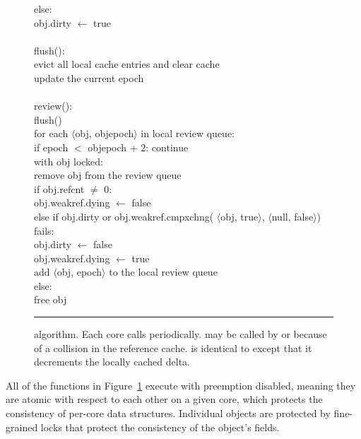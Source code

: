 \begin{figure}
\begin{tabbing}
          else: \+\\
            obj.dirty $\gets$ true \\
    \-\-\-\-\\[\fgap]
    flush(): \+\\
      evict all local cache entries and clear cache \\
      update the current epoch \\
    \-\\[\fgap]
    review(): \+\\
      flush() \\
      for each $\langle$obj, objepoch$\rangle$ in local review queue: \+\\
        if epoch $<$ objepoch + 2: continue \\
        with obj locked: \+\\
          remove obj from the review queue \\
          if obj.refcnt $\ne$ 0: \+\\
            obj.weakref.dying $\gets$ false \-\\
          else if obj.dirty or obj.weakref.cmpxchng(%
                $\langle$obj, true$\rangle$,
                $\langle$null, false$\rangle$) fails: \+\\
            obj.dirty $\gets$ false \\
            obj.weakref.dying $\gets$ true \\
            add $\langle$obj, epoch$\rangle$ to the local review queue \-\\
          else: \+\\
            free obj
  \end{tabbing}
  \vspace{-1em}                 %
  \rule{\columnwidth}{0.5pt}
  \vspace{-\baselineskip}
  \caption[ algorithm.]
  { algorithm.  Each core calls 
    periodically.   may be called by  or because of a
    collision in the reference cache.   is identical to  except
    that it decrements the locally cached delta.}
  \label{fig:refcache-code}
\end{figure}

All of the functions in Figure~\ref{fig:refcache-code} execute with
preemption disabled, meaning they are atomic with respect to each
other on a given core, which protects the consistency of per-core data
structures.  Individual objects are protected by fine-grained locks
that protect the consistency of the object's fields.


